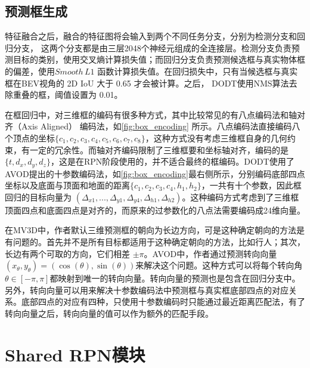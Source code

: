 \subsection{预测框生成}



特征融合之后，融合的特征图将会输入到两个不同任务分支，分别为检测分支和回归分支， 这两个分支都是由三层2048个神经元组成的全连接层。检测分支负责预测目标的类别，使用交叉熵计算损失值；而回归分支负责预测候选框与真实物体框的偏差，使用$Smooth \, L1$ 函数计算损失值。在回归损失中，只有当候选框与真实框在BEV视角的 2D IoU 大于 0.65 才会被计算。之后， DODT使用NMS算法去除重叠的框，阈值设置为 0.01。

在框回归中，对三维框的编码有很多种方式，其中比较常见的有八点编码法和轴对齐（Axis Aligned） 编码法，如\figurename \ref{fig:box_encoding} 所示。八点编码法直接编码八个顶点的坐标$\{c_1,c_2,c_3,c_4,c_5,c_6,c_7,c_8\}$，这种方式没有考虑三维框自身的几何约束，有一定的冗余性。而轴对齐编码限制了三维框要和坐标轴对齐，编码的是$\{t,d_x,d_y,d_z\}$，这是在RPN阶段使用的，并不适合最终的框编码。DODT使用了AVOD提出的十参数编码法，如\figurename \ref{fig:box_encoding}最右侧所示，分别编码底部四点坐标以及底面与顶面和地面的距离$\{c_1,c_2,c_3,c_4,h_1,h_2\}$，一共有十个参数，因此框回归的目标向量为 $(\Delta_{x1}, ...,\Delta_{y1}, \Delta_{y4}, \Delta_{h1}, \Delta_{h2})$。这种编码方式考虑到了三维框顶面四点和底面四点是对齐的，而原来的过参数化的八点法需要编码成24维向量。

在MV3D中，作者默认三维预测框的朝向为长边方向，可是这种确定朝向的方法是有问题的。首先并不是所有目标都适用于这种确定朝向的方法，比如行人；其次，长边有两个可取的方向，它们相差 $\pm \pi$。AVOD中，作者通过预测转向向量 $(x_{\theta},y_{\theta}) = (\cos(\theta), \sin(\theta))$来解决这个问题。这种方式可以将每个转向角$\theta \in [-\pi, \pi]$都映射到唯一的转向向量。转向向量的预测也是包含在回归分支中。另外，转向向量可以用来解决十参数编码法中预测框与真实框底部四点的对应关系。底部四点的对应有四种，只使用十参数编码时只能通过最近距离匹配法，有了转向向量之后，转向向量的值可以作为额外的匹配手段。


\section{Shared RPN模块}
\label{shared_rpn}



